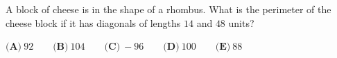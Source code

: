 A block of cheese is in the shape of a rhombus. What is the perimeter of the cheese block if it has diagonals of lengths $14$ and $48$ units?

$\textbf{(A)}~92\qquad\textbf{(B)}~104\qquad\textbf{(C)}~-96\qquad\textbf{(D)}~100\qquad\textbf{(E)}~88\qquad$
